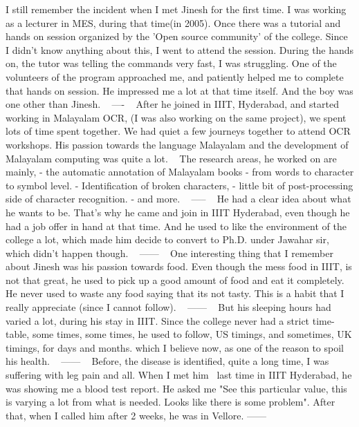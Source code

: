 \newpage
{}
I still remember the incident when I met Jinesh for the first time.
I was working as a lecturer in MES, during that time(in 2005). Once there was a tutorial and hands on session organized by the 'Open source community' of the college. Since I didn’t know anything about this, I went to attend the session. During the hands on, the tutor was telling the commands very fast, I was struggling. One of the volunteers of the program approached me, and patiently helped me to complete that hands on session. He impressed me a lot at that time itself. And the boy was one other than Jinesh.
 
----
 
After he joined in IIIT, Hyderabad, and started working in Malayalam OCR, (I was also working on the same project), we spent lots of time spent together. We had quiet a few journeys together to attend OCR workshops. His passion towards the language Malayalam and the development of Malayalam computing was quite a lot.
 
The research areas, he worked on are mainly,
- the automatic annotation of Malayalam books - from words to character to symbol level.
- Identification of broken characters,
- little bit of post-processing side of character recognition.
- and more.
 
-----
 
He had a clear idea about what he wants to be. That’s why he came and join in IIIT Hyderabad, even though he had a job offer in hand at that time. And he used to like the environment of the college a lot, which made him decide to convert to Ph.D. under Jawahar sir, which didn’t happen though.
 
------
 
One interesting thing that I remember about Jinesh was his passion towards food. Even though the mess food in IIIT, is not that great, he used to pick up a good amount of food and eat it completely. He never used to waste any food saying that its not tasty. This is a habit that I really appreciate (since I cannot follow).
 
------
 
But his sleeping hours had varied a lot, during his stay in IIIT. Since the college never had a strict time-table, some times, some times, he used to follow, US timings, and sometimes, UK timings, for days and months. which I believe now, as one of the reason to spoil his health.
 
------
 
Before, the disease is identified, quite a long time, I was suffering with leg pain and all. When I met him  last time in IIIT Hyderabad, he was showing me a blood test report. He asked me "See this particular value, this is varying a lot from what is needed. Looks like there is some problem". After that, when I called him after 2 weeks, he was in Vellore.
------
\newpage
